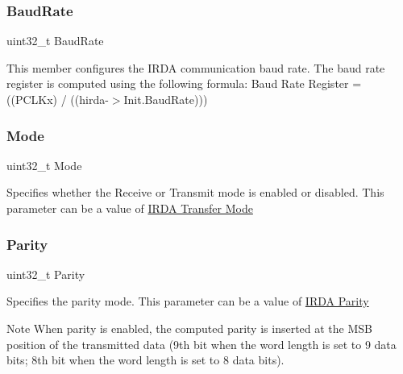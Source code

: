 \subsubsection{\texorpdfstring{Baud\+Rate}{BaudRate}}
{\footnotesize\ttfamily uint32\+\_\+t Baud\+Rate}

This member configures the I\+R\+DA communication baud rate. The baud rate register is computed using the following formula\+: Baud Rate Register = ((P\+C\+L\+Kx) / ((hirda-\/$>$Init.\+Baud\+Rate))) \mbox{\label{struct_i_r_d_a___init_type_def_a0ffc93ec511ed9cf1663f6939bd3e839}} 
\subsubsection{\texorpdfstring{Mode}{Mode}}
{\footnotesize\ttfamily uint32\+\_\+t Mode}

Specifies whether the Receive or Transmit mode is enabled or disabled. This parameter can be a value of \hyperlink{group___i_r_d_a___transfer___mode}{I\+R\+DA Transfer Mode} \mbox{\label{struct_i_r_d_a___init_type_def_a1d60a99b8f3965f01ab23444b154ba79}} 
\subsubsection{\texorpdfstring{Parity}{Parity}}
{\footnotesize\ttfamily uint32\+\_\+t Parity}

Specifies the parity mode. This parameter can be a value of \hyperlink{group___i_r_d_a___parity}{I\+R\+DA Parity} \begin{DoxyNote}{Note}
When parity is enabled, the computed parity is inserted at the M\+SB position of the transmitted data (9th bit when the word length is set to 9 data bits; 8th bit when the word length is set to 8 data bits). 
\end{DoxyNote}
\mbox{\label{struct_i_r_d_a___init_type_def_ad999103a24bf9607c6c44c75f7b30013}} 
